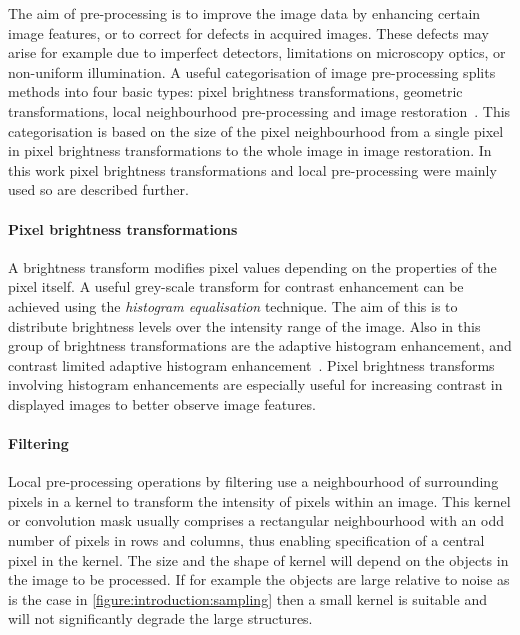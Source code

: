 The aim of pre-processing is to improve the image data by enhancing certain image features, or to correct for defects in acquired images. These defects may arise for example due to imperfect detectors, limitations on microscopy optics, or non-uniform illumination. A useful categorisation of image pre-processing splits methods into four basic types: pixel brightness transformations, geometric transformations, local neighbourhood pre-processing and image restoration~\cite{Sonka2007}. This categorisation is based on the size of the pixel neighbourhood from a single pixel in pixel brightness transformations to the whole image in image restoration. In this work pixel brightness transformations and local pre-processing were mainly used so are described further.

\paragraph{Pixel brightness transformations} A brightness transform modifies pixel values depending on the properties of the pixel itself. A useful grey-scale transform for contrast enhancement can be achieved using the \emph{histogram equalisation} technique. The aim of this is to distribute brightness levels over the intensity range of the image. Also in this group of brightness transformations are the adaptive histogram enhancement, and contrast limited adaptive histogram enhancement~\cite{Ketcham1974}. Pixel brightness transforms involving histogram enhancements are especially useful for increasing contrast in displayed images to better observe image features.

\paragraph{Filtering} Local pre-processing operations by filtering use a neighbourhood of surrounding pixels in a kernel to transform the intensity of pixels within an image. This kernel or convolution mask usually comprises a rectangular neighbourhood with an odd number of pixels in rows and columns, thus enabling specification of a central pixel in the kernel. The size and the shape of kernel will depend on the objects in the image to be processed. If for example the objects are large relative to noise as is the case in \autoref{figure:introduction:sampling} then a small kernel is suitable and  will not significantly degrade the large structures.

